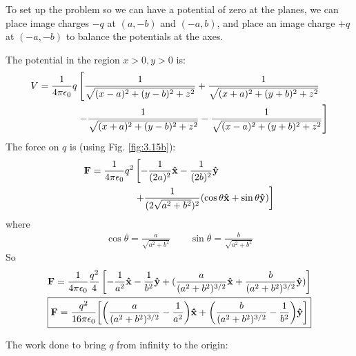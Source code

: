 \documentclass[../main.tex]{subfiles}
\begin{document}
To set up the problem so we can have a potential of zero at the planes, we can place image charges $-q$ at
$(a, -b)$ and $(-a, b)$, and place an image charge $+q$ at $(-a, -b)$ to balance the potentials at the axes.

The potential in the region $x > 0, y > 0$ is:
\begin{align*}
    V = \frac{1}{4\pi\epsilon_0} q 
        &\left[ \frac{1}{\sqrt{(x - a)^2 + (y - b)^2 + z^2}} + \frac{1}{\sqrt{(x + a)^2 + (y + b)^2 + z^2}} \right. \\
        &\left. - \frac{1}{\sqrt{(x + a)^2 + (y - b)^2 + z^2}} - \frac{1}{\sqrt{(x - a)^2 + (y + b)^2 + z^2}}\right]
\end{align*}
The force on $q$ is (using Fig. \ref{fig:3.15b}):
\begin{align*}
    \vb F = \frac{1}{4\pi\epsilon_0} q^2
        &\left[ -\frac{1}{(2a)^2} \vu x - \frac{1}{(2b)^2} \vu y \right. \\
        &\left. + \frac{1}{(2\sqrt{a^2 + b^2})^2} (\cos \theta \vu x + \sin \theta \vu y) \right]
\end{align*}
where
\begin{align*}
    \cos \theta = \frac{a}{\sqrt{a^2 + b^2}} \qquad \sin \theta = \frac{b}{\sqrt{a^2 + b^2}}
\end{align*}
So 
\begin{align*}
    \vb F = \ke \frac{q^2}{4} \left[ -\frac{1}{a^2} \vu x - \frac{1}{b^2} \vu y + (\frac{a}{(a^2 + b^2)^{3/2}} \vu x + \frac{b}{(a^2 + b^2)^{3/2}} \vu y) \right] \\
    \boxed{\vb F = \frac{q^2}{16\pi \epsilon_0} \qt[
        \qt(\frac{a}{(a^2 + b^2)^{3/2}} - \frac{1}{a^2}) \vu x + \qt(\frac{b}{(a^2 + b^2)^{3/2}} - \frac{1}{b^2}) \vu y
    ]}
\end{align*}

\newpage
The work done to bring $q$ from infinity to the origin: 
\end{document}
